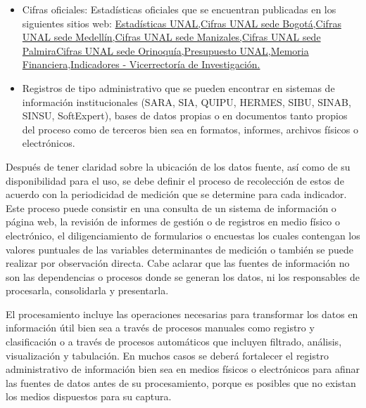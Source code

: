 \documentclass[
]{book}
\begin{document}
\begin{itemize}
\item
  Cifras oficiales: Estadísticas oficiales que se encuentran publicadas en los siguientes sitios web: \href{http://estadisticas.unal.edu.co/home/}{Estadísticas UNAL,}\href{http://estadisticas.unal.edu.co/menu-principal/cifras-sedes/bogota/}{Cifras UNAL sede Bogotá,}\href{http://estadisticas.unal.edu.co/menu-principal/cifras-sedes/bogota/,\%20http://estadisticas.unal.edu.co/menu-principal/cifras-sedes/medellin/}{Cifras UNAL sede Medellín,}\href{http://estadisticas.unal.edu.co/menu-principal/cifras-sedes/manizales/}{Cifras UNAL sede Manizales,}\href{http://estadisticas.unal.edu.co/menu-principal/cifras-sedes/palmira/,}{Cifras UNAL sede Palmira}\href{https://estadisticaun.github.io/BoletinOrinoquia/}{Cifras UNAL sede Orinoquía,}\href{http://gerencia.unal.edu.co/index.php?id=134}{Presupuesto UNAL,}\href{http://gerencia.unal.edu.co/index.php?id=147}{Memoria Financiera,}\href{http://cifrasvri.unal.edu.co/}{Indicadores - Vicerrectoría de Investigación.}
\item
  Registros de tipo administrativo que se pueden encontrar en sistemas de información institucionales (SARA, SIA, QUIPU, HERMES, SIBU, SINAB, SINSU, SoftExpert), bases de datos propias o en documentos tanto propios del proceso como de terceros bien sea en formatos, informes, archivos físicos o electrónicos.
\end{itemize}

Después de tener claridad sobre la ubicación de los datos fuente, así como de su disponibilidad para el uso, se debe definir el proceso de recolección de estos de acuerdo con la periodicidad de medición que se determine para cada indicador. Este proceso puede consistir en una consulta de un sistema de información o página web, la revisión de informes de gestión o de registros en medio físico o electrónico, el diligenciamiento de formularios o encuestas los cuales contengan los valores puntuales de las variables determinantes de medición o también se puede realizar por observación directa. Cabe aclarar que las fuentes de información no son las dependencias o procesos donde se generan los datos, ni los responsables de procesarla, consolidarla y presentarla.

El procesamiento incluye las operaciones necesarias para transformar los datos en información útil bien sea a través de procesos manuales como registro y clasificación o a través de procesos automáticos que incluyen filtrado, análisis, visualización y tabulación. En muchos casos se deberá fortalecer el registro administrativo de información bien sea en medios físicos o electrónicos para afinar las fuentes de datos antes de su procesamiento, porque es posibles que no existan los medios dispuestos para su captura.
\end{document}
